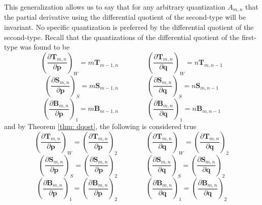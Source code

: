 \documentclass[a4paper]{article}
\theoremstyle{definition}
\begin{document}
This generalization allows us to say that for any arbitrary quantization $A_{m,n}$ that the partial derivative using the differential quotient of the second-type will be invariant. No specific quantization is preferred by the differential quotient of the second-type. Recall that the quantizations of the differential quotient of the first-type was found to be
\begin{equation}
	\left(\frac{\partial \textbf{T}_{m,n}}{\partial\textbf{p}}\right)_W=m\textbf{T}_{m-1,n}\qquad\qquad\left(\frac{\partial\textbf{T}_{m,n}}{\partial\textbf{q}}\right)_W=n\textbf{T}_{m,n-1}
\end{equation}
\begin{equation}
	\left(\frac{\partial \textbf{S}_{m,n}}{\partial\textbf{p}}\right)_S=m\textbf{S}_{m-1,n}\qquad\qquad\left(\frac{\partial\textbf{S}_{m,n}}{\partial\textbf{q}}\right)_S=n\textbf{S}_{m,n-1}
\end{equation}
\begin{equation}
	\left(\frac{\partial \textbf{B}_{m,n}}{\partial\textbf{p}}\right)_1=m\textbf{B}_{m-1,n}\qquad\qquad\left(\frac{\partial\textbf{B}_{m,n}}{\partial\textbf{q}}\right)_1=n\textbf{B}_{m,n-1}
\end{equation}
and by Theorem \ref{thm: dqost}, the following is considered true
\begin{equation}
	\left(\frac{\partial\textbf{T}_{m,n}}{\partial\textbf{p}}\right)_W=\left(\frac{\partial\textbf{T}_{m,n}}{\partial\textbf{p}}\right)_2\qquad\qquad\left(\frac{\partial\textbf{T}_{m,n}}{\partial\textbf{q}}\right)_W=\left(\frac{\partial\textbf{T}_{m,n}}{\partial\textbf{q}}\right)_2
\end{equation}
\begin{equation}
	\left(\frac{\partial\textbf{S}_{m,n}}{\partial\textbf{p}}\right)_S=\left(\frac{\partial\textbf{S}_{m,n}}{\partial\textbf{p}}\right)_2\qquad\qquad\left(\frac{\partial\textbf{S}_{m,n}}{\partial\textbf{q}}\right)_S=\left(\frac{\partial\textbf{S}_{m,n}}{\partial\textbf{q}}\right)_2
\end{equation}
\begin{equation}
	\left(\frac{\partial\textbf{B}_{m,n}}{\partial\textbf{p}}\right)_1=\left(\frac{\partial\textbf{B}_{m,n}}{\partial\textbf{p}}\right)_2\qquad\qquad\left(\frac{\partial\textbf{B}_{m,n}}{\partial\textbf{q}}\right)_1=\left(\frac{\partial\textbf{B}_{m,n}}{\partial\textbf{q}}\right)_2
\end{equation}
\end{document}
